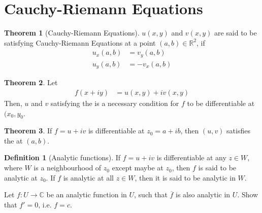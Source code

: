 \documentclass[titlepage, fleqn, a4paper, 12pt, twoside]{article}
\theoremstyle{definition}
\newtheorem{definition}{Definition}
\theoremstyle{theorem}
\newtheorem{theorem}{Theorem}
\begin{document}
\section{Cauchy-Riemann Equations}

\begin{theorem}[Cauchy-Riemann Equations]
	$u(x,y)$ and $v(x,y)$ are said to be satisfying Cauchy-Riemann Equations at a point $(a,b) \in \mathbb{R}^2$, if
	\begin{align*}
		u_x(a,b) & = v_y(a,b) \\
		u_y(a,b) & = -v_x(a,b)
	\end{align*}
	\label{Cauchy-Riemann_Equations}
\end{theorem}

\begin{theorem}
	Let
	\begin{align*}
		f(x + i y) & = u(x,y) + i v(x,y)
	\end{align*}
	Then, $u$ and $v$ satisfying the  is a necessary condition for $f$ to be differentiable at $(x_0,y_0$.
\end{theorem}

\begin{theorem}
	If $f = u + i v$ is differentiable at $z_0 = a + i b$, then $(u,v)$ satisfies the  at $(a,b)$.
\end{theorem}

\begin{definition}[Analytic functions]
	If $f = u + i v$ is differentiable at any $z \in W$, where $W$ is a neighbourhood of $z_0$ except maybe at $z_0$, then $f$ is said to be analytic at $z_0$.
	If $f$ is analytic at all $z \in W$, then it is said to be analytic in $W$.
\end{definition}

\begin{question}
	Let $f : U \to \mathbb{C}$ be an analytic function in $U$, such that $\overline{f}$ is also analytic in $U$.
	Show that $f' = 0$, i.e. $f = c$.
\end{question}
\end{document}
